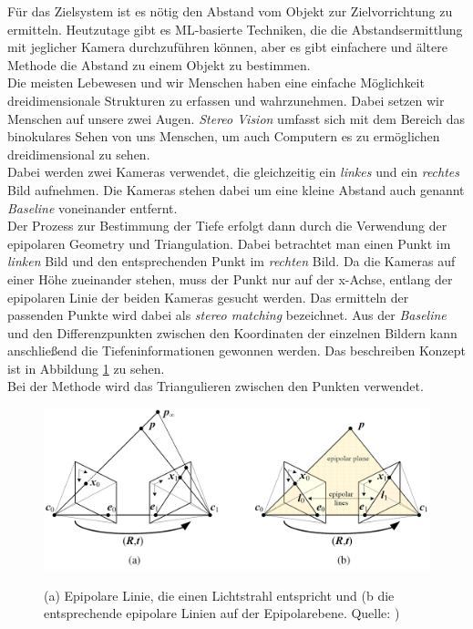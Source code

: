 Für das Zielsystem ist es nötig den Abstand vom Objekt zur Zielvorrichtung zu ermitteln. Heutzutage gibt es \ac{ML}-basierte Techniken, die die Abstandsermittlung mit jeglicher Kamera durchzuführen können, aber es gibt einfachere und ältere Methode die Abstand zu einem Objekt zu bestimmen.
\\
Die meisten Lebewesen und wir Menschen haben eine einfache Möglichkeit dreidimensionale Strukturen zu erfassen und wahrzunehmen. Dabei setzen wir Menschen auf unsere zwei Augen. \textit{Stereo Vision} umfasst sich mit dem Bereich das binokulares Sehen von uns Menschen, um auch Computern es zu ermöglichen dreidimensional zu sehen.
\\
Dabei werden zwei Kameras verwendet, die gleichzeitig ein \textit{linkes} und ein \textit{rechtes} Bild aufnehmen. Die Kameras stehen dabei um eine kleine Abstand auch genannt \textit{Baseline} voneinander entfernt.
\\
Der Prozess zur Bestimmung der Tiefe erfolgt dann durch die Verwendung der epipolaren Geometry und Triangulation. Dabei betrachtet man einen Punkt im \textit{linken} Bild und den entsprechenden Punkt im \textit{rechten} Bild. Da die Kameras auf einer Höhe zueinander stehen, muss der Punkt nur auf der x-Achse, entlang der epipolaren Linie der beiden Kameras gesucht werden. Das ermitteln der passenden Punkte wird dabei als \textit{stereo matching} bezeichnet.
Aus der \textit{Baseline} und den Differenzpunkten zwischen den Koordinaten der einzelnen Bildern kann anschließend die Tiefeninformationen gewonnen werden. Das beschreiben Konzept ist in Abbildung \ref{fig:stereo_depth} zu sehen.
\\
Bei der Methode wird das Triangulieren zwischen den Punkten verwendet.
\cite{stereo_vision}

\begin{figure}[h]
    \centering
    \includegraphics[width=\textwidth]{images/depth_sample.png}
    \label{fig:stereo_depth}
    \caption{(a) Epipolare Linie, die einen Lichtstrahl entspricht und (b die entsprechende epipolare Linien auf der Epipolarebene. Quelle: \cite{cv_Szeliski})}
\end{figure}

